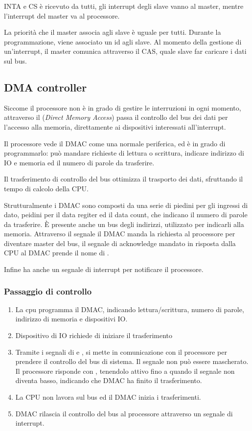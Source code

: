 \documentclass[../template]{subfiles}
\begin{document}
INTA e CS è ricevuto da tutti, gli interrupt degli slave vanno al master, mentre l'interrupt del master va al processore.

La priorità che il master associa agli slave è uguale per tutti.
Durante la programmazione, viene associato un id agli slave. Al momento della gestione di un'interrupt, il master comunica attraverso il CAS, quale slave far caricare i dati sul bus.

\subsection{DMA controller}
Siccome il processore non è in grado di gestire le interruzioni in ogni momento, attraverso il  (\textit{Direct Memory Access}) passa il controllo del bus dei dati per l'accesso alla memoria, direttamente ai dispositivi interessati all'interrupt.

Il processore vede il DMAC come una normale periferica, ed è in grado di programmarlo: può mandare richieste di lettura o scrittura, indicare indirizzo di IO e memoria ed il numero di parole da trasferire.

Il trasferimento di controllo del bus ottimizza il trasporto dei dati, sfruttando il tempo di calcolo della CPU.

Strutturalmente i DMAC sono composti da una serie di piedini per gli ingressi di dato, peidini per il data regiter ed il data count, che indicano il numero di parole da trasferire.
È presente anche un bus degli indirizzi, utilizzato per indicarli alla memoria.
Attraverso il segnale  il DMAC manda la richiesta al processore per diventare master del bus, il segnale di acknowledge mandato in risposta dalla CPU al DMAC prende il nome di .

Infine ha anche un segnale di interrupt per notificare il processore.

\subsubsection{Passaggio di controllo}
\begin{enumerate}
    \item La cpu programma il DMAC, indicando lettura/scrittura, numero di parole, indirizzo di memoria e dispositivi IO.
    \item Dispositivo di IO richiede di iniziare il trasferimento
    \item Tramite i segnali di  e , si mette in comunicazione con il processore per prendere il controllo del bus di sistema.
        Il segnale  non può essere mascherato. Il processore risponde con , tenendolo attivo fino a quando il segnale  non diventa basso, indicando che DMAC ha finito il trasferimento.
    \item La CPU non lavora sul bus ed il DMAC inizia i trasferimenti.

    \item DMAC rilascia il controllo del bus al processore attraverso un segnale di interrupt.
\end{enumerate}
\end{document}
